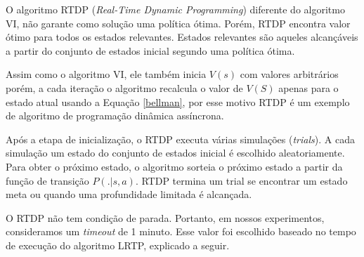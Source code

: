 
O algoritmo RTDP (\textit{Real-Time Dynamic Programming}) \cite{barto95} diferente do algoritmo VI, não garante como solução uma política ótima. Porém, RTDP encontra valor ótimo para todos os estados relevantes. Estados relevantes são aqueles alcançáveis a partir do conjunto de estados inicial segundo uma política ótima.

Assim como o algoritmo VI, ele também inicia $V(s)$ com valores arbitrários porém, a cada iteração o algoritmo recalcula o valor de $V(S)$ apenas para o estado atual usando a Equação \ref{bellman}, por esse motivo RTDP é um exemplo de algoritmo de programação dinâmica assíncrona.

Após a etapa de inicialização, o RTDP executa várias simulações (\textit{trials}). A cada simulação um estado do conjunto de estados inicial é escolhido aleatoriamente. Para obter o próximo estado, o algoritmo sorteia o próximo estado a partir da função de transição $P(.|s, a)$. RTDP termina um trial se encontrar um estado meta ou quando uma profundidade limitada é alcançada.

O RTDP não tem condição de parada. Portanto, em nossos experimentos, consideramos um \textit{timeout} de 1 minuto. Esse valor foi escolhido baseado no tempo de execução do algoritmo LRTP, explicado a seguir.
